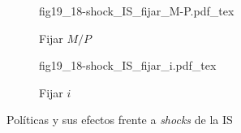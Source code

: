 \begin{figure}[h]
\captionsetup[subfigure]{aboveskip=20pt,belowskip=15pt}
\centering
\begin{subfigure}{.45\textwidth}
  \centering
        \def\svgwidth{\textwidth}
        {fig19_18-shock_IS_fijar_M-P.pdf_tex}
  \caption{Fijar $M/P$}
  \label{fig19_18-shock_IS_fijar_M-P}
\end{subfigure}\hspace{.05\textwidth}
\begin{subfigure}{.45\textwidth}
  \centering
        \def\svgwidth{\textwidth}
        {fig19_18-shock_IS_fijar_i.pdf_tex}
  \caption{Fijar $i$}
  \label{fig19_18-shock_IS_fijar_i}
\end{subfigure}
\caption{Políticas y sus efectos frente a \textit{shocks} de la IS}
\label{fig19_18-shock_IS}
\end{figure}
